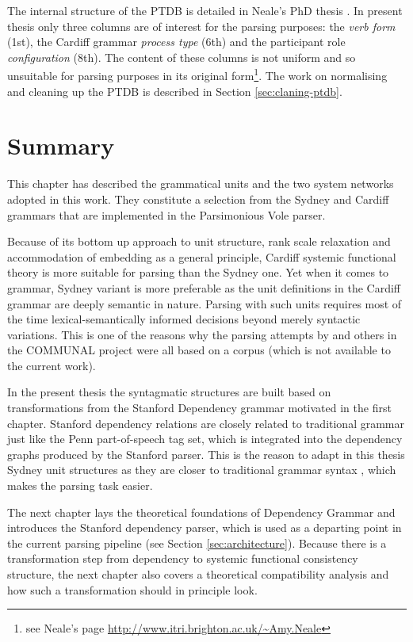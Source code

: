     The internal structure of the PTDB is detailed in Neale's PhD thesis \citep[193--231]{Neale2002}. In present thesis only three columns are of interest for the parsing purposes: the \textit{verb form} (1st), the Cardiff grammar \textit{process type} (6th) and the participant role \textit{configuration} (8th). The content of these columns is not uniform and so unsuitable for parsing purposes in its original form\footnote{see Neale's page  \url{http://www.itri.brighton.ac.uk/~Amy.Neale}}. The work on normalising and cleaning up the PTDB is described in Section \ref{sec:claning-ptdb}. 
    
    


\section{Summary}
    This chapter has described the grammatical units and the two system networks adopted in this work. They constitute a selection from the Sydney and Cardiff grammars that are implemented in the Parsimonious Vole parser.
    
    Because of its bottom up approach to unit structure, rank scale relaxation and accommodation of embedding as a general principle, Cardiff systemic functional theory is more suitable for parsing than the Sydney one. Yet when it comes to grammar, Sydney variant is more preferable as the unit definitions in the Cardiff grammar are deeply semantic in nature. Parsing with such units requires most of the time lexical-semantically informed decisions beyond merely syntactic variations. This is one of the reasons why the parsing attempts by \citet{ODonoghue1991a} and others in the COMMUNAL project were all based on a corpus (which is not available to the current work). 
    
    In the present thesis the syntagmatic structures are built based on transformations from the Stanford Dependency grammar motivated in the first chapter. Stanford dependency relations are closely related to traditional grammar just like the Penn part-of-speech tag set, which is integrated into the dependency graphs produced by the Stanford parser. This is the reason to adapt in this thesis Sydney unit structures as they are closer to traditional grammar syntax \citep{Quirk1985}, which makes the parsing task easier.
    
    The next chapter lays the theoretical foundations of Dependency Grammar and introduces the Stanford dependency parser, which is used as a departing point in the current parsing pipeline (see Section \ref{sec:architecture}). Because there is a transformation step from dependency to systemic functional consistency structure, the next chapter also covers a theoretical compatibility analysis and how such a transformation should in principle look. 

